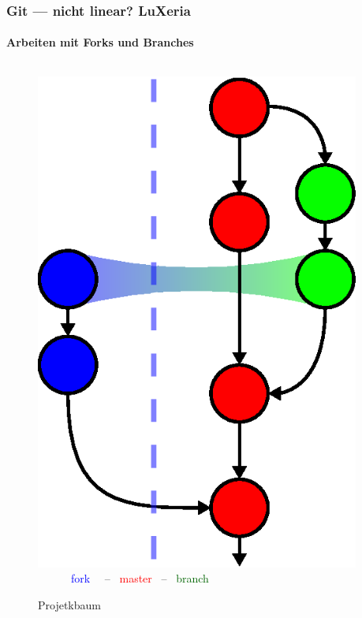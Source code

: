 \begin{frame}
    \frametitle{Git --- nicht linear?\hfill{} \footnotesize{LuXeria}}
    \framesubtitle{Arbeiten mit Forks und Branches}
    \begin{columns}
        \begin{column}{5cm}
            \begin{figure}
                \includegraphics[scale=0.5]{git_tree.eps}\\
                \textcolor{blue}{~~~~~~fork~~} -- \textcolor{red}{~master~} -- \textcolor{darkgreen}{~branch}
                \caption{Projetkbaum}
            \end{figure}
        \end{column}
        \begin{column}{5cm}

\end{column}
\end{columns}
\end{frame}
